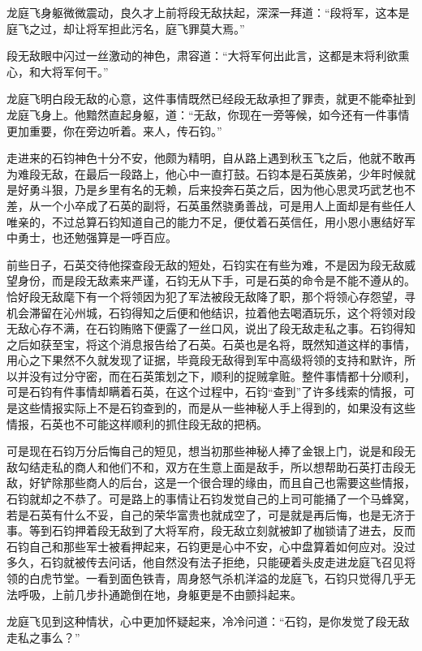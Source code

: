 龙庭飞身躯微微震动，良久才上前将段无敌扶起，深深一拜道：“段将军，这本是庭飞之过，却让将军担此污名，庭飞罪莫大焉。”

段无敌眼中闪过一丝激动的神色，肃容道：“大将军何出此言，这都是末将利欲熏心，和大将军何干。”

龙庭飞明白段无敌的心意，这件事情既然已经段无敌承担了罪责，就更不能牵扯到龙庭飞身上。他黯然直起身躯，道：“无敌，你现在一旁等候，如今还有一件事情更加重要，你在旁边听着。来人，传石钧。”

走进来的石钧神色十分不安，他颇为精明，自从路上遇到秋玉飞之后，他就不敢再为难段无敌，在最后一段路上，他心中一直打鼓。石钧本是石英族弟，少年时候就是好勇斗狠，乃是乡里有名的无赖，后来投奔石英之后，因为他心思灵巧武艺也不差，从一个小卒成了石英的副将，石英虽然骁勇善战，可是用人上面却是有些任人唯亲的，不过总算石钧知道自己的能力不足，便仗着石英信任，用小恩小惠结好军中勇士，也还勉强算是一呼百应。

前些日子，石英交待他探查段无敌的短处，石钧实在有些为难，不是因为段无敌威望身份，而是段无敌素来严谨，石钧无从下手，可是石英的命令是不能不遵从的。恰好段无敌麾下有一个将领因为犯了军法被段无敌降了职，那个将领心存怨望，寻机会滞留在沁州城，石钧得知之后便和他结识，拉着他去喝酒玩乐，这个将领对段无敌心存不满，在石钧贿赂下便露了一丝口风，说出了段无敌走私之事。石钧得知之后如获至宝，将这个消息报告给了石英。石英也是名将，既然知道这样的事情，用心之下果然不久就发现了证据，毕竟段无敌得到军中高级将领的支持和默许，所以并没有过分守密，而在石英策划之下，顺利的捉贼拿赃。整件事情都十分顺利，可是石钧有件事情却瞒着石英，在这个过程中，石钧“查到”了许多线索的情报，可是这些情报实际上不是石钧查到的，而是从一些神秘人手上得到的，如果没有这些情报，石英也不可能这样顺利的抓住段无敌的把柄。

可是现在石钧万分后悔自己的短见，想当初那些神秘人捧了金银上门，说是和段无敌勾结走私的商人和他们不和，双方在生意上面是敌手，所以想帮助石英打击段无敌，好铲除那些商人的后台，这是一个很合理的缘由，而且自己也需要这些情报，石钧就却之不恭了。可是路上的事情让石钧发觉自己的上司可能捅了一个马蜂窝，若是石英有什么不妥，自己的荣华富贵也就成空了，可是就是再后悔，也是无济于事。等到石钧押着段无敌到了大将军府，段无敌立刻就被卸了枷锁请了进去，反而石钧自己和那些军士被看押起来，石钧更是心中不安，心中盘算着如何应对。没过多久，石钧就被传去问话，他自然没有法子拒绝，只能硬着头皮走进龙庭飞召见将领的白虎节堂。一看到面色铁青，周身怒气杀机洋溢的龙庭飞，石钧只觉得几乎无法呼吸，上前几步扑通跪倒在地，身躯更是不由颤抖起来。

龙庭飞见到这种情状，心中更加怀疑起来，冷冷问道：“石钧，是你发觉了段无敌走私之事么？”

